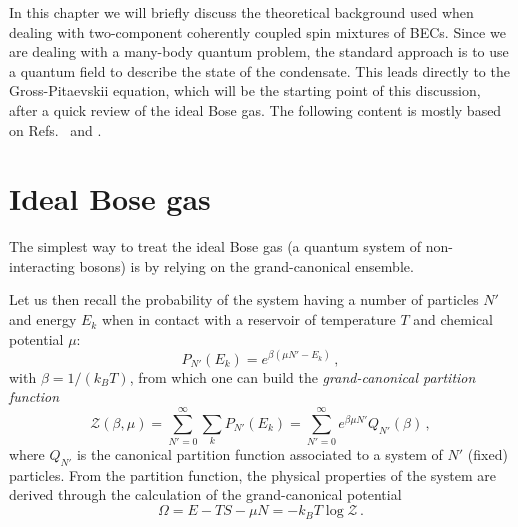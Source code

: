 In this chapter we will briefly discuss the theoretical background used when dealing with two-component coherently coupled spin mixtures of BECs. Since we are dealing with a many-body quantum problem, the standard approach is to use a quantum field to describe the state of the condensate. This leads directly to the Gross-Pitaevskii equation, which will be the starting point of this discussion, after a quick review of the ideal Bose gas. The following content is mostly based on Refs.\ \cite{pitaevskii2016bose} and \cite{lamporesi2023two}.

\section{Ideal Bose gas}
The simplest way to treat the ideal Bose gas (a quantum system of non-interacting bosons) is by relying on the grand-canonical ensemble. 

Let us then recall the probability of the system having a number of particles $N'$ and energy $E_k$ when in contact with a reservoir of temperature $T$ and chemical potential $\mu$:
\begin{equation*}
    P_{N'}(E_k) = e^{\beta(\mu N' - E_k)}\, ,
\end{equation*}
with $\beta = 1/(k_B T)$, from which one can build the \textit{grand-canonical partition function}
\begin{equation}
    \mathcal{Z}(\beta, \mu) = \sum_{N' = 0}^\infty \sum_k P_{N'}(E_k) = \sum_{N' = 0}^\infty e^{\beta \mu N'} Q_{N'}(\beta)\, ,
    \label{eq:part_func}
\end{equation}
where $Q_{N'}$ is the canonical partition function associated to a system of $N'$ (fixed) particles. From the partition function, the physical properties of the system are derived through the calculation of the grand-canonical potential 
\begin{equation}
    \Omega = E - T S - \mu N = -k_B T \log\mathcal{Z}\, .
    \label{eq:GC_potential}
\end{equation}

